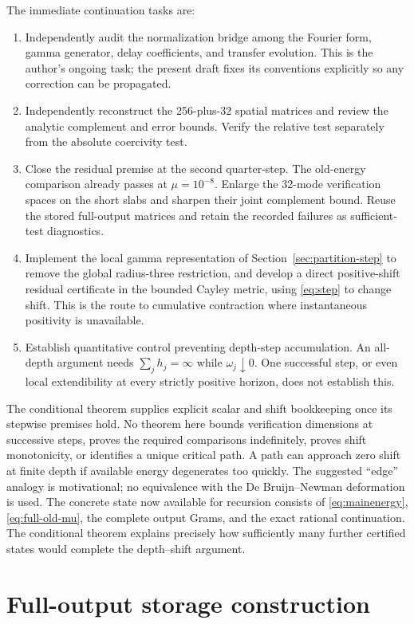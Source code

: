 \documentclass[11pt]{article}
\theoremstyle{remark}\newtheorem{remark}[theorem]{Remark}
\begin{document}
The immediate continuation tasks are:
\nopagebreak[4]
\begin{enumerate}
\item Independently audit the normalization bridge among the Fourier form, gamma generator, delay coefficients, and transfer evolution. This is the author's ongoing task; the present draft fixes its conventions explicitly so any correction can be propagated.
\item Independently reconstruct the 256-plus-32 spatial matrices and review the analytic complement and error bounds. Verify the relative test separately from the absolute coercivity test.
\item Close the residual premise at the second quarter-step. The old-energy comparison already passes at $\mu=10^{-8}$. Enlarge the 32-mode verification spaces on the short slabs and sharpen their joint complement bound. Reuse the stored full-output matrices and retain the recorded failures as sufficient-test diagnostics.
\item Implement the local gamma representation of Section~\ref{sec:partition-step} to remove the global radius-three restriction, and develop a direct positive-shift residual certificate in the bounded Cayley metric, using \eqref{eq:step} to change shift. This is the route to cumulative contraction where instantaneous positivity is unavailable.
\item Establish quantitative control preventing depth-step accumulation. An all-depth argument needs $\sum_jh_j=\infty$ while $\omega_j\downarrow0$. One successful step, or even local extendibility at every strictly positive horizon, does not establish this.
\end{enumerate}
The conditional theorem supplies explicit scalar and shift bookkeeping once its stepwise premises hold. No theorem here bounds verification dimensions at successive steps, proves the required comparisons indefinitely, proves shift monotonicity, or identifies a unique critical path. A path can approach zero shift at finite depth if available energy degenerates too quickly. The suggested ``edge'' analogy is motivational; no equivalence with the De Bruijn--Newman deformation is used. The concrete state now available for recursion consists of \eqref{eq:mainenergy}, \eqref{eq:full-old-mu}, the complete output Grams, and the exact rational continuation. The conditional theorem explains precisely how sufficiently many further certified states would complete the depth--shift argument.

\appendix
\section{Full-output storage construction}\label{app:storage}
\end{document}
